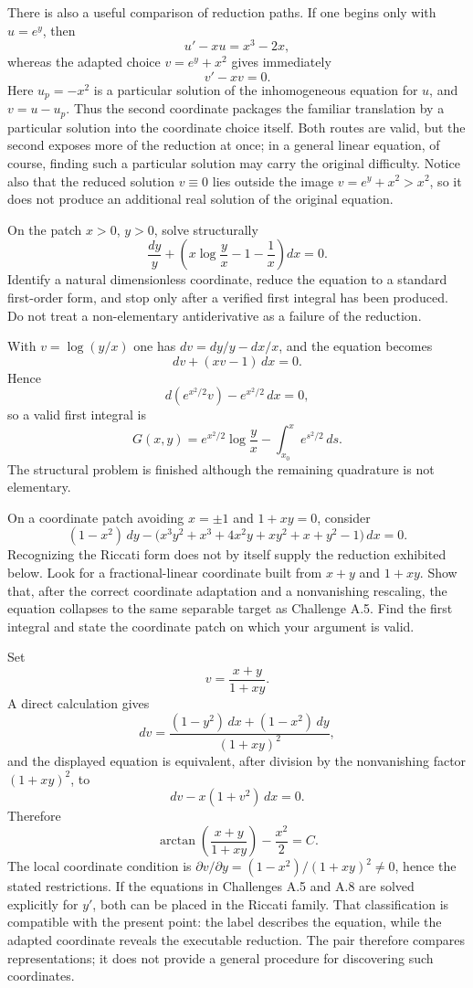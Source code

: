 \documentclass[11pt]{article}
\theoremstyle{definition}
\begin{document}
There is also a useful comparison of reduction paths. If one begins only with \(u=e^y\), then
\[
u'-xu=x^3-2x,
\]
whereas the adapted choice \(v=e^y+x^2\) gives immediately
\[
v'-xv=0.
\]
Here \(u_p=-x^2\) is a particular solution of the inhomogeneous equation for \(u\), and \(v=u-u_p\). Thus the second coordinate packages the familiar translation by a particular solution into the coordinate choice itself. Both routes are valid, but the second exposes more of the reduction at once; in a general linear equation, of course, finding such a particular solution may carry the original difficulty. Notice also that the reduced solution \(v\equiv0\) lies outside the image \(v=e^y+x^2>x^2\), so it does not produce an additional real solution of the original equation.

\begin{challengebox}[title={Challenge A.7: structural success without an elementary quadrature}]
On the patch $x>0$, $y>0$, solve structurally
\[
\frac{dy}{y}
+\left(x\log\frac{y}{x}-1-\frac1x\right)dx=0.
\]
Identify a natural dimensionless coordinate, reduce the equation to a standard first-order form, and stop only after a verified first integral has been produced. Do not treat a non-elementary antiderivative as a failure of the reduction.
\end{challengebox}

With $v=\log(y/x)$ one has $dv=dy/y-dx/x$, and the equation becomes
\[
dv+(xv-1)\,dx=0.
\]
Hence
\[
d\left(e^{x^2/2}v\right)-e^{x^2/2}\,dx=0,
\]
so a valid first integral is
\[
G(x,y)=e^{x^2/2}\log\frac{y}{x}
-\int_{x_0}^{x}e^{s^2/2}\,ds.
\]
The structural problem is finished although the remaining quadrature is not elementary.

\begin{challengebox}[title={Challenge A.8: a deliberately hostile surface form}]
On a coordinate patch avoiding $x=\pm1$ and $1+xy=0$, consider
\[
(1-x^2)\,dy
-\bigl(x^3y^2+x^3+4x^2y+xy^2+x+y^2-1\bigr)\,dx=0.
\]
Recognizing the Riccati form does not by itself supply the reduction exhibited below. Look for a fractional-linear coordinate built from $x+y$ and $1+xy$. Show that, after the correct coordinate adaptation and a nonvanishing rescaling, the equation collapses to the same separable target as Challenge A.5. Find the first integral and state the coordinate patch on which your argument is valid.
\end{challengebox}

Set
\[
v=\frac{x+y}{1+xy}.
\]
A direct calculation gives
\[
dv=\frac{(1-y^2)\,dx+(1-x^2)\,dy}{(1+xy)^2},
\]
and the displayed equation is equivalent, after division by the nonvanishing factor $(1+xy)^2$, to
\[
dv-x(1+v^2)\,dx=0.
\]
Therefore
\[
\boxed{
\arctan\!\left(\frac{x+y}{1+xy}\right)-\frac{x^2}{2}=C.}
\]
The local coordinate condition is $\partial v/\partial y=(1-x^2)/(1+xy)^2\neq0$, hence the stated restrictions. If the equations in Challenges A.5 and A.8 are solved explicitly for \(y'\), both can be placed in the Riccati family. That classification is compatible with the present point: the label describes the equation, while the adapted coordinate reveals the executable reduction. The pair therefore compares representations; it does not provide a general procedure for discovering such coordinates.
\end{document}
